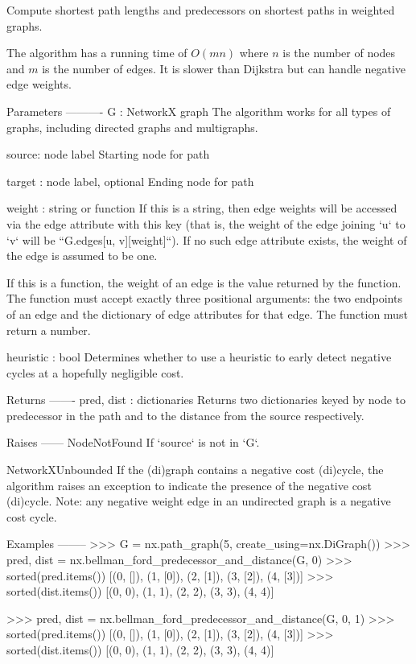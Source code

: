 \begin{DoxyVerb}Compute shortest path lengths and predecessors on shortest paths
in weighted graphs.

The algorithm has a running time of $O(mn)$ where $n$ is the number of
nodes and $m$ is the number of edges.  It is slower than Dijkstra but
can handle negative edge weights.

Parameters
----------
G : NetworkX graph
    The algorithm works for all types of graphs, including directed
    graphs and multigraphs.

source: node label
    Starting node for path

target : node label, optional
    Ending node for path

weight : string or function
    If this is a string, then edge weights will be accessed via the
    edge attribute with this key (that is, the weight of the edge
    joining `u` to `v` will be ``G.edges[u, v][weight]``). If no
    such edge attribute exists, the weight of the edge is assumed to
    be one.

    If this is a function, the weight of an edge is the value
    returned by the function. The function must accept exactly three
    positional arguments: the two endpoints of an edge and the
    dictionary of edge attributes for that edge. The function must
    return a number.

heuristic : bool
    Determines whether to use a heuristic to early detect negative
    cycles at a hopefully negligible cost.

Returns
-------
pred, dist : dictionaries
    Returns two dictionaries keyed by node to predecessor in the
    path and to the distance from the source respectively.

Raises
------
NodeNotFound
    If `source` is not in `G`.

NetworkXUnbounded
    If the (di)graph contains a negative cost (di)cycle, the
    algorithm raises an exception to indicate the presence of the
    negative cost (di)cycle.  Note: any negative weight edge in an
    undirected graph is a negative cost cycle.

Examples
--------
>>> G = nx.path_graph(5, create_using=nx.DiGraph())
>>> pred, dist = nx.bellman_ford_predecessor_and_distance(G, 0)
>>> sorted(pred.items())
[(0, []), (1, [0]), (2, [1]), (3, [2]), (4, [3])]
>>> sorted(dist.items())
[(0, 0), (1, 1), (2, 2), (3, 3), (4, 4)]

>>> pred, dist = nx.bellman_ford_predecessor_and_distance(G, 0, 1)
>>> sorted(pred.items())
[(0, []), (1, [0]), (2, [1]), (3, [2]), (4, [3])]
>>> sorted(dist.items())
[(0, 0), (1, 1), (2, 2), (3, 3), (4, 4)]


\end{DoxyVerb}
